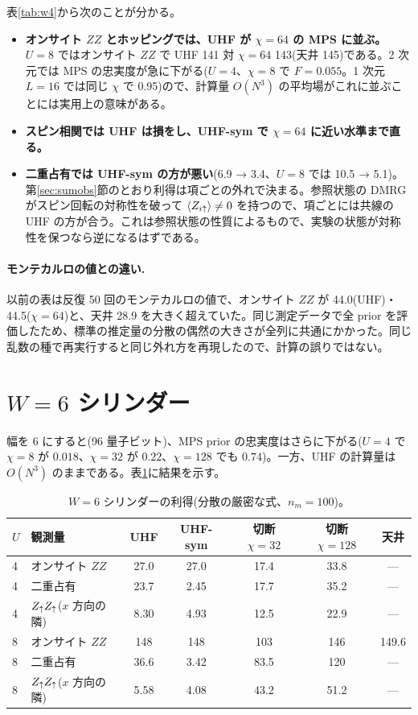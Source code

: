 表\ref{tab:w4}から次のことが分かる。
\begin{itemize}
  \item \textbf{オンサイト $ZZ$ とホッピングでは、UHF が $\chi=64$ の MPS に並ぶ。} $U=8$ ではオンサイト $ZZ$ で UHF 141 対 $\chi=64$ 143(天井 145)である。2 次元では MPS の忠実度が急に下がる($U=4$、$\chi=8$ で $F=0.055$。1 次元 $L=16$ では同じ $\chi$ で 0.95)ので、計算量 $O(N^3)$ の平均場がこれに並ぶことには実用上の意味がある。
  \item \textbf{スピン相関では UHF は損をし、UHF-sym で $\chi=64$ に近い水準まで直る。}
  \item \textbf{二重占有では UHF-sym の方が悪い}(6.9 → 3.4、$U=8$ では 10.5 → 5.1)。第\ref{sec:sumobs}節のとおり利得は項ごとの外れで決まる。参照状態の DMRG がスピン回転の対称性を破って $\langle Z_{i\uparrow}\rangle\ne0$ を持つので、項ごとには共線の UHF の方が合う。これは参照状態の性質によるもので、実験の状態が対称性を保つなら逆になるはずである。
\end{itemize}

\paragraph{モンテカルロの値との違い.}以前の表は反復 50 回のモンテカルロの値で、オンサイト $ZZ$ が 44.0(UHF)・44.5($\chi=64$)と、天井 28.9 を大きく超えていた。同じ測定データで全 prior を評価したため、標準の推定量の分散の偶然の大きさが全列に共通にかかった。同じ乱数の種で再実行すると同じ外れ方を再現したので、計算の誤りではない。

\section{$W=6$ シリンダー}
\label{sec:w6}

幅を 6 にすると(96 量子ビット)、MPS prior の忠実度はさらに下がる($U=4$ で $\chi=8$ が $0.018$、$\chi=32$ が $0.22$、$\chi=128$ でも $0.74$)。一方、UHF の計算量は $O(N^3)$ のままである。表\ref{tab:w6}に結果を示す。

\begin{table}[t]
\centering\small
\caption{$W=6$ シリンダーの利得(分散の厳密な式、$n_m=100$)。}
\label{tab:w6}
\begin{tabular}{@{}llccccc@{}}
\toprule
$U$ & 観測量 & UHF & UHF-sym & 切断 $\chi{=}32$ & 切断 $\chi{=}128$ & 天井 \\
\midrule
4 & オンサイト $ZZ$ & 27.0 & 27.0 & 17.4 & 33.8 & --- \\
4 & 二重占有 & 23.7 & 2.45 & 17.7 & 35.2 & --- \\
4 & $Z_\uparrow Z_\uparrow$($x$ 方向の隣) & 8.30 & 4.93 & 12.5 & 22.9 & --- \\
8 & オンサイト $ZZ$ & 148 & 148 & 103 & 146 & 149.6 \\
8 & 二重占有 & 36.6 & 3.42 & 83.5 & 120 & --- \\
8 & $Z_\uparrow Z_\uparrow$($x$ 方向の隣) & 5.58 & 4.08 & 43.2 & 51.2 & --- \\
\bottomrule
\end{tabular}
\end{table}

